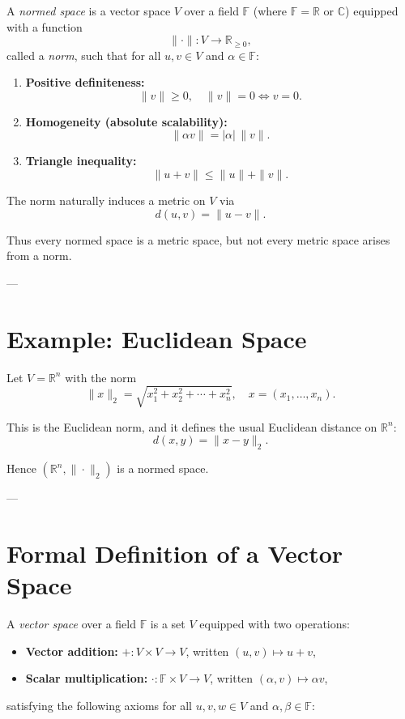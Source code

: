 \documentclass[11pt,a4paper]{article}
\theoremstyle{definition}
\theoremstyle{remark}
\begin{document}
	A \emph{normed space} is a vector space $V$ over a field $\mathbb{F}$ (where $\mathbb{F}=\mathbb{R}$ or $\mathbb{C}$) equipped with a function 
	$$
	\|\cdot\| : V \to \mathbb{R}_{\geq 0},
	$$
	called a \emph{norm}, such that for all $u,v \in V$ and $\alpha \in \mathbb{F}$:
	
	\begin{enumerate}
		\item \textbf{Positive definiteness:}
		$$
		\|v\| \geq 0, \quad \|v\| = 0 \iff v=0.
		$$
		
		\item \textbf{Homogeneity (absolute scalability):}
		$$
		\|\alpha v\| = |\alpha| \, \|v\|.
		$$
		
		\item \textbf{Triangle inequality:}
		$$
		\|u+v\| \leq \|u\| + \|v\|.
		$$
	\end{enumerate}
	
	The norm naturally induces a metric on $V$ via
	$$
	d(u,v) = \|u-v\|.
	$$
	
	Thus every normed space is a metric space, but not every metric space arises from a norm.
	
	---
	
	\section*{Example: Euclidean Space}
	
	Let $V = \mathbb{R}^n$ with the norm
	$$
	\|x\|_2 = \sqrt{x_1^2 + x_2^2 + \cdots + x_n^2}, \quad x=(x_1,\dots,x_n).
	$$
	
	This is the Euclidean norm, and it defines the usual Euclidean distance on $\mathbb{R}^n$:
	$$
	d(x,y) = \|x-y\|_2.
	$$
	
	Hence $(\mathbb{R}^n,\|\cdot\|_2)$ is a normed space.
	
	---
	
	\section*{Formal Definition of a Vector Space}
	
	A \emph{vector space} over a field $\mathbb{F}$ is a set $V$ equipped with two operations:
	\begin{itemize}
		\item \textbf{Vector addition:} $+: V \times V \to V$, written $(u,v) \mapsto u+v$,
		\item \textbf{Scalar multiplication:} $\cdot: \mathbb{F} \times V \to V$, written $(\alpha,v) \mapsto \alpha v$,
	\end{itemize}
	satisfying the following axioms for all $u,v,w \in V$ and $\alpha,\beta \in \mathbb{F}$:
	
\end{document}

